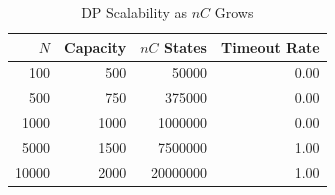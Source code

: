 \begin{table}[htbp]
\caption{DP Scalability as $nC$ Grows}
\label{tab:dp-scalability}
\centering
\begin{tabular}{rrrr}
\hline
$N$ & Capacity & $nC$ States & Timeout Rate \\
\hline
100 & 500 & 50000 & 0.00 \\
500 & 750 & 375000 & 0.00 \\
1000 & 1000 & 1000000 & 0.00 \\
5000 & 1500 & 7500000 & 1.00 \\
10000 & 2000 & 20000000 & 1.00 \\
\hline
\end{tabular}
\end{table}
